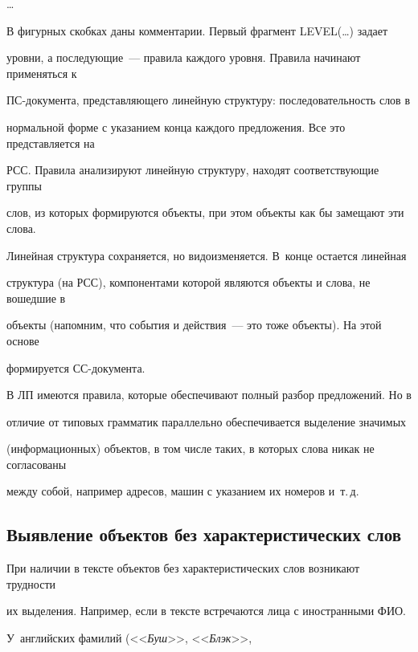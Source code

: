 \ldots





     В фигурных скобках даны комментарии. Первый фрагмент  {\sf LEVEL(\ldots)} задает 


уровни, а последующие~--- правила каждого уровня. Правила начинают применяться к 


ПС-документа, представляющего линейную структуру: последовательность слов в 


нормальной форме с указанием конца каждого предложения. Все это представляется на 


РСС. Правила анализируют линейную структуру, находят соответствующие группы 


слов, из которых формируются объекты, при этом объекты как бы замещают эти слова. 


Линейная структура сохраняется, но видоизменяется. В~конце остается линейная 


структура (на РСС), компонентами которой являются объекты и слова, не вошедшие в 


объекты (напомним, что события и действия~--- это тоже объекты). На этой основе 


формируется СС-документа.   





В ЛП имеются правила, которые обеспечивают полный разбор предложений. Но в 


отличие от типовых грамматик параллельно обеспечивается выделение значимых 


(информационных) объектов, в том числе таких, в которых слова никак не согласованы 


между собой, например адресов, машин с указанием их номеров и~т.\,д.


 


\subsection{Выявление объектов без характеристических слов}


      


      При наличии в тексте объектов без характеристических слов возникают трудности 


их выделения.  Например, если в тексте встречаются лица с иностранными ФИО. 


У~английских фамилий (<<\textit{Буш}>>, <<\textit{Блэк}>>, 



